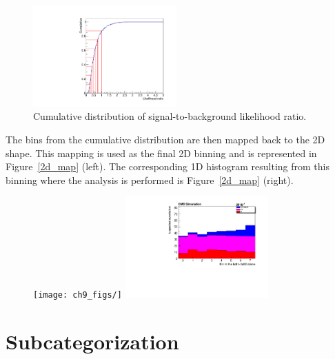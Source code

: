 \begin{figure}[htp]
\centering
\includegraphics[width=0.49\textwidth]{ch9_figs/cumulative_2lss.pdf}
\caption[Cumulative distribution of signal-to-background likelihood ratio]{Cumulative distribution of signal-to-background likelihood ratio.}
\label{fig:cum_dist}
\end{figure}

The bins from the cumulative distribution are then mapped back to the 2D shape. This mapping is used as the final 2D binning and is represented in Figure~\ref{2d_map} (left).
The corresponding 1D histogram resulting from this binning where the analysis is performed is Figure~\ref{2d_map} (right). 

\begin{figure}[htp]
\centering
\texttt{[image: ch9\_figs/]}
\includegraphics[width=0.49\textwidth]{ch9_figs/likelihoodBased_1d_2lss.pdf}
\caption[]{}
\label{fig:2d_map}
\end{figure}


\section{Subcategorization}



